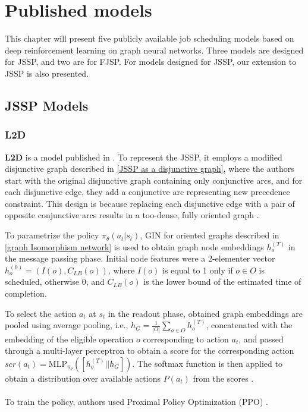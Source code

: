 \chapter{Published models}

This chapter will present five publicly available job scheduling models based on deep reinforcement learning on graph neural networks. Three models are designed for JSSP, and two are for FJSP. For models designed for JSSP, our extension to JSSP is also presented. 

\section{JSSP Models}

\subsection{L2D}
\textbf{L2D} is a model published in \cite{zhang2020learning}. To represent the JSSP, it employs a modified disjunctive graph described in \ref{JSSP as a disjunctive graph}, where the authors start with the original disjunctive graph containing only conjunctive arcs, and for each disjunctive edge, they add a conjunctive arc representing new precedence constraint. This design is because replacing each disjunctive edge with a pair of opposite conjunctive arcs results in a too-dense, fully oriented graph \cite{zhang2020learning}.
\par
To parametrize the policy $\pi_\theta(a_t|s_t)$, GIN for oriented graphs described in \ref{graph Isomorphism network} is used to obtain graph node embeddings $h_o^{(T)}$ in the message passing phase. Initial node features were a 2-elementer vector $h_o^{(0)} = (I(o), C_{LB}(o))$, where $I(o)$ is equal to 1 only if $o \in O$ is scheduled, otherwise 0, and $C_{LB}(o)$ is the lower bound of the estimated time of completion. 
\par
To select the action $a_t$ at $s_t$ in the readout phase, obtained graph embeddings are pooled using average pooling, i.e., $h_G = \frac{1}{|O|} \sum_{o \in O} h_o^{(T)}$, concatenated with the embedding of the eligible operation $o$ corresponding to action $a_t$, and passed through a multi-layer perceptron to obtain a score for the corresponding action $scr(a_t) = \text{MLP}_{\pi_\theta}\left ( \left [h_o^{(T)} || h_G \right ] \right )$. The softmax function is then applied to obtain a distribution over available actions $P(a_t)$ from the scores \cite{zhang2020learning}.\\
\\
To train the policy, authors used Proximal Policy Optimization (PPO) \cite{DBLP:journals/corr/SchulmanWDRK17}. 

